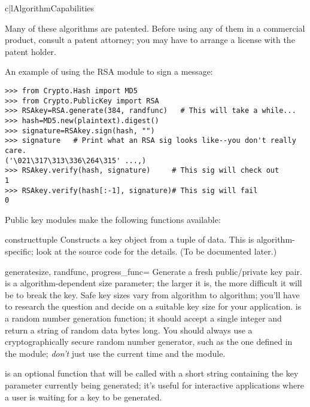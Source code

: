\documentclass{howto}
\begin{document}
\begin{tableii}{c|l}{}{Algorithm}{Capabilities}
\end{tableii}

Many of these algorithms are patented.  Before using any of them in a
commercial product, consult a patent attorney; you may have to arrange
a license with the patent holder.

An example of using the RSA module to sign a message:
\begin{verbatim}
>>> from Crypto.Hash import MD5
>>> from Crypto.PublicKey import RSA
>>> RSAkey=RSA.generate(384, randfunc)   # This will take a while...
>>> hash=MD5.new(plaintext).digest()
>>> signature=RSAkey.sign(hash, "")
>>> signature   # Print what an RSA sig looks like--you don't really care.
('\021\317\313\336\264\315' ...,)
>>> RSAkey.verify(hash, signature)     # This sig will check out
1
>>> RSAkey.verify(hash[:-1], signature)# This sig will fail
0
\end{verbatim}

       
Public key modules make the following functions available:

\begin{funcdesc}{construct}{tuple}
Constructs a key object from a tuple of data.  This is
algorithm-specific; look at the source code for the details.  (To be
documented later.)
\end{funcdesc}

\begin{funcdesc}{generate}{size, randfunc, progress_func=}
Generate a fresh public/private key pair.   is a
algorithm-dependent size parameter; the larger it is, the more
difficult it will be to break the key.  Safe key sizes vary from
algorithm to algorithm; you'll have to research the question and
decide on a suitable key size for your application.  
is a random number generation function; it should accept a single
integer  and return a string of random data  bytes long.
You should always use a cryptographically secure random number
generator, such as the one defined in the  module;
\emph{don't} just use the current time and the  module.

 is an optional function that will be called with a short
string containing the key parameter currently being generated; it's
useful for interactive applications where a user is waiting for a key to
be generated.
\end{funcdesc}
\end{document}
